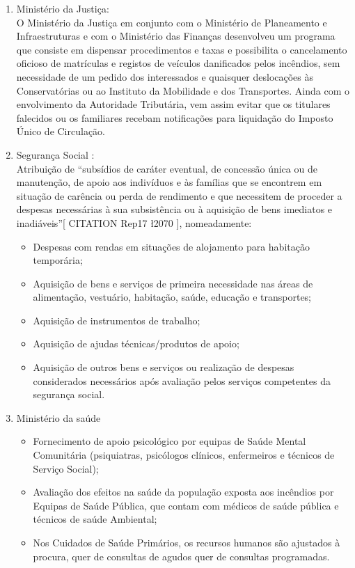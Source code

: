 \documentclass{report}
\begin{document}
\begin{enumerate}
 \item Ministério da Justiça:\\
 O Ministério da Justiça em conjunto com o Ministério de Planeamento e Infraestruturas e com o Ministério das Finanças desenvolveu um programa que consiste em dispensar procedimentos e taxas e possibilita o cancelamento oficioso de matrículas e registos de veículos danificados pelos incêndios, sem necessidade de um pedido dos interessados e quaisquer deslocações às Conservatórias ou ao Instituto da Mobilidade e dos Transportes.
 Ainda com o envolvimento da Autoridade Tributária, vem assim evitar que os titulares falecidos ou os familiares recebam notificações para liquidação do Imposto Único de Circulação.
 
 \item Segurança Social :\\
 Atribuição de “subsídios de caráter eventual, de concessão única ou de manutenção, de apoio aos indivíduos e às famílias que se encontrem em situação de carência ou perda de rendimento e que necessitem de proceder a despesas necessárias à sua subsistência ou à aquisição de bens imediatos e inadiáveis”[ CITATION Rep17 \l 2070 ], nomeadamente:
 \begin{itemize}
 
  \item Despesas com rendas em situações de alojamento para habitação temporária; 
  \item Aquisição de bens e serviços de primeira necessidade nas áreas de alimentação, vestuário, habitação, saúde, educação e transportes; 
  \item Aquisição de instrumentos de trabalho; 
  \item Aquisição de ajudas técnicas/produtos de apoio; 
  \item Aquisição de outros bens e serviços ou realização de despesas considerados necessários após avaliação pelos serviços competentes da segurança social.
  
 \end{itemize}
 
 \item Ministério da saúde
 \begin{itemize}
  \item Fornecimento de apoio psicológico por equipas de Saúde Mental Comunitária (psiquiatras, psicólogos clínicos, enfermeiros e técnicos de Serviço Social); 
  \item Avaliação dos efeitos na saúde da população exposta aos incêndios por Equipas de Saúde Pública, que contam com médicos de saúde pública e técnicos de saúde Ambiental;
  \item Nos Cuidados de Saúde Primários, os recursos humanos são ajustados à procura, quer de consultas de agudos quer de consultas programadas.
  

\end{itemize}
\end{enumerate}
\end{document}
